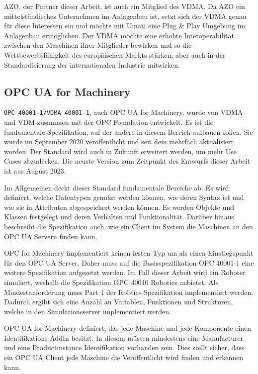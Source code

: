 \documentclass[a4paper, 12pt, oneside, toc=listofnumbered, bibliography=totoc]{scrbook}
\begin{document}
		AZO, der Partner dieser Arbeit, ist auch ein Mitglied des VDMA. Da AZO ein mittelständisches Unternehmen im Anlagenbau ist, setzt sich der VDMA genau für diese Interessen ein und möchte mit \ac{Umati} eine Plug \& Play Umgebung im Anlagenbau ermöglichen. Der VDMA möchte eine erhöhte Interoperabilität zwischen den Maschinen ihrer Mitglieder bewirken und so die Wettbewerbsfähigkeit des europäischen Markts stärken, aber auch in der Standardisierung der internationalen Industrie mitwirken. 
		
		\subsection{OPC UA for Machinery}
		
		\texttt{OPC 40001-1/VDMA 40001-1}, auch OPC UA for Machinery, wurde von VDMA und VDM zusammen mit der OPC Foundation entwickelt. Es ist die fundamentale Spezifikation, auf der andere in diesem Bereich aufbauen sollen. Sie wurde im September 2020 veröffentlicht und seit dem mehrfach aktualisiert worden. Der Standard wird auch in Zukunft erweitert werden, um mehr Use Cases abzudecken. Die neuste Version zum Zeitpunkt des Entwurfs dieser Arbeit ist aus August 2023.
		
		Im Allgemeinen deckt dieser Standard fundamentale Bereiche ab. Es wird definiert, welche Datentypen genutzt werden können, wie deren Syntax ist und wie sie in Attributen abgespeichert werden können. Es werden Objekte und Klassen festgelegt und deren Verhalten und Funktionalität. Darüber hinaus beschreibt die Spezifikation auch, wie ein Client im System die Maschinen an den OPC UA Servern finden kann. 
		
		OPC for Machinery implementiert keinen festen Typ um als einen Einstiegspunkt für den OPC UA Server. Daher muss auf die Basisspezifikation OPC 40001-1 eine weitere Spezifikation aufgesetzt werden. Im Fall dieser Arbeit wird ein Roboter simuliert, weshalb die Spezifikation OPC 40010 Robotics anbietet. Als Mindestanforderung muss Part 1 der Robtics-Spezifikation implementiert werden. Dadurch ergibt sich eine Anzahl an Variablen, Funktionen und Strukturen, welche in den Simulationsserver implementiert werden.
		
		OPC UA for Machinery definiert, das jede Maschine und jede Komponente einen Identifikations-AddIn besitzt. In diesem müssen mindestens eine Manufacturer und eine Productinstance Identifikation vorhanden sein. Dies stellt sicher, dass ein OPC UA Client jede Maschine die Veröffentlicht wird finden und erkennen kann.  
\end{document}
